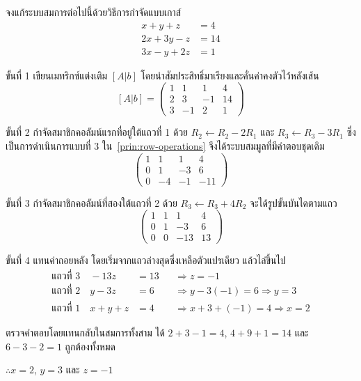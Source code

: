 \begin{ex}
\label{ex:gauss-unique}
จงแก้ระบบสมการต่อไปนี้ด้วยวิธีการกำจัดแบบเกาส์
\[
\begin{aligned}
x + y + z &= 4 \\
2x + 3y - z &= 14 \\
3x - y + 2z &= 1
\end{aligned}
\]
\end{ex}
\begin{solution}
ขั้นที่ 1 เขียนเมทริกซ์แต่งเติม $[A|b]$ โดยนำสัมประสิทธิ์มาเรียงและคั่นค่าคงตัวไว้หลังเส้น
\[ [A|b] = \left(\begin{array}{ccc|c} 1 & 1 & 1 & 4 \\ 2 & 3 & -1 & 14 \\ 3 & -1 & 2 & 1 \end{array}\right) \]

ขั้นที่ 2 กำจัดสมาชิกคอลัมน์แรกที่อยู่ใต้แถวที่ 1 ด้วย $R_2 \leftarrow R_2 - 2R_1$ และ $R_3 \leftarrow R_3 - 3R_1$ ซึ่งเป็นการดำเนินการแบบที่ 3 ใน~\autoref{prin:row-operations} จึงได้ระบบสมมูลที่มีคำตอบชุดเดิม
\[ \left(\begin{array}{ccc|c} 1 & 1 & 1 & 4 \\ 0 & 1 & -3 & 6 \\ 0 & -4 & -1 & -11 \end{array}\right) \]

ขั้นที่ 3 กำจัดสมาชิกคอลัมน์ที่สองใต้แถวที่ 2 ด้วย $R_3 \leftarrow R_3 + 4R_2$ จะได้รูปขั้นบันไดตามแถว
\[ \left(\begin{array}{ccc|c} 1 & 1 & 1 & 4 \\ 0 & 1 & -3 & 6 \\ 0 & 0 & -13 & 13 \end{array}\right) \]

ขั้นที่ 4 แทนค่าถอยหลัง โดยเริ่มจากแถวล่างสุดซึ่งเหลือตัวแปรเดียว แล้วไล่ขึ้นไป
\begin{align*}
\text{แถวที่ 3} \quad -13z &= 13 &&\Rightarrow z = -1\\
\text{แถวที่ 2} \quad y - 3z &= 6 &&\Rightarrow y - 3(-1) = 6 \Rightarrow y = 3\\
\text{แถวที่ 1} \quad x + y + z &= 4 &&\Rightarrow x + 3 + (-1) = 4 \Rightarrow x = 2
\end{align*}

ตรวจคำตอบโดยแทนกลับในสมการทั้งสาม ได้ $2+3-1=4$, $4+9+1=14$ และ $6-3-2=1$ ถูกต้องทั้งหมด

$\therefore x = 2$, $y = 3$ และ $z = -1$ \solhere
\end{solution}

